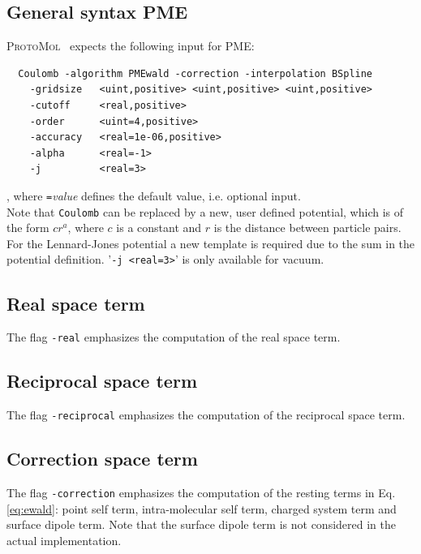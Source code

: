 \documentclass[11pt]{article}
\newcommand{\ProtoMol}{\textsc{ProtoMol }}
\begin{document}
\subsection{General syntax PME}

\ProtoMol\  expects the following input for PME:
\begin{verbatim}
  Coulomb -algorithm PMEwald -correction -interpolation BSpline
    -gridsize   <uint,positive> <uint,positive> <uint,positive>
    -cutoff     <real,positive>
    -order      <uint=4,positive>	
    -accuracy   <real=1e-06,positive>
    -alpha      <real=-1>
    -j          <real=3>
\end{verbatim}
, where \texttt{=}{\it value} defines the default value, i.e. optional
input.\\
Note that \texttt{Coulomb} can be replaced by a new, user defined potential,
which is of the form $c r^a$, where $c$ is a constant and $r$ is the
distance between particle pairs. For the Lennard-Jones potential a new
template is required due to the sum in the potential definition.
'\texttt{-j <real=3>}' is only available for vacuum.

\subsection{Real space term}

The flag \texttt{-real} emphasizes the computation of the real space term.

\subsection{Reciprocal space term}

The flag \texttt{-reciprocal} emphasizes the computation of the reciprocal space term.

\subsection{Correction  space term}

The flag \texttt{-correction} emphasizes the computation of the
resting terms in Eq. \ref{eq:ewald}: 
point self term, intra-molecular self term, charged system term
and surface dipole term. Note that the surface dipole term is not considered in the actual implementation.
\end{document}
